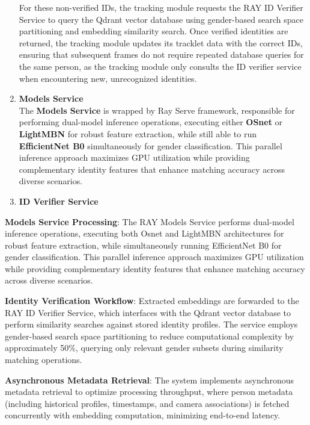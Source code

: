 \begin{enumerate}
    For these non-verified IDs, the tracking module requests the RAY ID Verifier Service to query the Qdrant vector database using gender-based search space partitioning and embedding similarity search. Once verified identities are returned, the tracking module updates its tracklet data with the correct IDs, ensuring that subsequent frames do not require repeated database queries for the same person, as the tracking module only consults the ID verifier service when encountering new, unrecognized identities.

    \item \textbf{Models Service}\\

    The \textbf{Models Service} is wrapped by Ray Serve framework, responsible for performing dual-model inference operations, executing either \textbf{OSnet} or \textbf{LightMBN} for robust feature extraction, while still able to run \textbf{EfficientNet B0} simultaneously for gender classification. This parallel inference approach maximizes GPU utilization while providing complementary identity features that enhance matching accuracy across diverse scenarios.

    \item \textbf{ID Verifier Service}\\
    
    
\end{enumerate}



\textbf{Models Service Processing}: The RAY Models Service performs dual-model inference operations, executing both Osnet and LightMBN architectures for robust feature extraction, while simultaneously running EfficientNet B0 for gender classification. This parallel inference approach maximizes GPU utilization while providing complementary identity features that enhance matching accuracy across diverse scenarios.

\textbf{Identity Verification Workflow}: Extracted embeddings are forwarded to the RAY ID Verifier Service, which interfaces with the Qdrant vector database to perform similarity searches against stored identity profiles. The service employs gender-based search space partitioning to reduce computational complexity by approximately 50\%, querying only relevant gender subsets during similarity matching operations.

\textbf{Asynchronous Metadata Retrieval}: The system implements asynchronous metadata retrieval to optimize processing throughput, where person metadata (including historical profiles, timestamps, and camera associations) is fetched concurrently with embedding computation, minimizing end-to-end latency.

